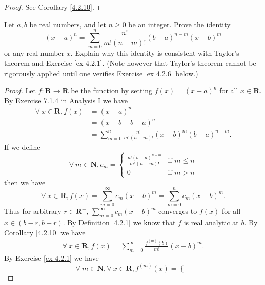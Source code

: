 \begin{proof}
    See Corollary \ref{4.2.10}.
\end{proof}

\begin{exercise}\label{ex 4.2.5}
    Let \(a, b\) be real numbers, and let \(n \geq 0\) be an integer.
    Prove the identity
    \[
        (x - a)^n = \sum_{m = 0}^n \frac{n!}{m! (n - m)!} (b - a)^{n - m} (x - b)^m
    \]
    or any real number \(x\).
    Explain why this identity is consistent with Taylor's theorem and Exercise \ref{ex 4.2.1}.
    (Note however that Taylor's theorem cannot be rigorously applied until one verifies Exercise \ref{ex 4.2.6} below.)
\end{exercise}

\begin{proof}
    Let \(f : \mathbf{R} \to \mathbf{R}\) be the function by setting \(f(x) = (x - a)^n\) for all \(x \in \mathbf{R}\).
    By Exercise 7.1.4 in Analysis I we have
    \begin{align*}
        \forall\ x \in \mathbf{R}, f(x) & = (x - a)^n                                                        \\
                                        & = (x - b + b - a)^n                                                \\
                                        & = \sum_{m = 0}^n \frac{n!}{m! (n - m)!} (x - b)^m (b - a)^{n - m}.
    \end{align*}
    If we define
    \[
        \forall\ m \in \mathbf{N}, c_m = \begin{cases}
            \frac{n! (b - a)^{n - m}}{m! (n - m)!} & \text{if } m \leq n \\
            0                                      & \text{if } m > n
        \end{cases}
    \]
    then we have
    \[
        \forall\ x \in \mathbf{R}, f(x) = \sum_{m = 0}^\infty c_m (x - b)^m = \sum_{m = 0}^n c_m (x - b)^m.
    \]
    Thus for arbitrary \(r \in \mathbf{R}^+\), \(\sum_{m = 0}^\infty c_m (x - b)^m\) converges to \(f(x)\) for all \(x \in (b - r, b + r)\).
    By Definition \ref{4.2.1} we know that \(f\) is real analytic at \(b\).
    By Corollary \ref{4.2.10} we have
    \begin{align*}
        \forall\ x \in \mathbf{R}, f(x) = \sum_{m = 0}^\infty \frac{f^{(m)}(b)}{m!} (x - b)^m.
    \end{align*}
    By Exercise \ref{ex 4.2.1} we have
    \[
        \forall\ m \in \mathbf{N}, \forall\ x \in \mathbf{R}, f^{(m)}(x) = \begin{cases}

\end{cases}\]
\end{proof}
